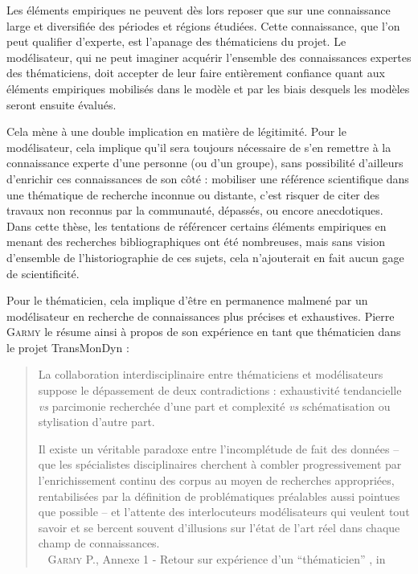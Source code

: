 Les éléments empiriques ne peuvent dès lors reposer que sur une connaissance large et diversifiée des périodes et régions étudiées.
Cette connaissance, que l'on peut qualifier d'experte, est l'apanage des \og thématiciens\fg{} du projet.
Le modélisateur, qui ne peut imaginer acquérir l'ensemble des connaissances expertes des thématiciens, doit accepter de leur faire entièrement confiance quant aux éléments empiriques mobilisés dans le modèle et par les biais desquels les modèles seront ensuite évalués.

Cela mène à une double implication en matière de légitimité.
Pour le modélisateur, cela implique qu'il sera toujours nécessaire de s'en remettre à la connaissance experte d'une personne (ou d'un groupe), sans possibilité d'ailleurs d'enrichir ces connaissances de son côté :
	mobiliser une référence scientifique dans une thématique de recherche inconnue ou distante, c'est risquer de citer des travaux non reconnus par la communauté, dépassés, ou encore anecdotiques.
Dans cette thèse, les tentations de référencer certains éléments empiriques en menant des recherches bibliographiques ont été nombreuses, mais sans vision d'ensemble de l'historiographie de ces sujets, cela n'ajouterait en fait aucun gage de scientificité.

Pour le thématicien, cela implique d'être en permanence \og malmené\fg{} par un modélisateur en recherche de connaissances plus précises et exhaustives.
Pierre \textsc{Garmy} le résume ainsi à propos de son expérience en tant que thématicien dans le projet TransMonDyn :
\begin{quotation}
\noindent \og La collaboration interdisciplinaire entre thématiciens et modélisateurs suppose le dépassement de deux contradictions : exhaustivité tendancielle \textit{vs} parcimonie recherchée d'une part et complexité \textit{vs} schématisation ou stylisation d'autre part.

\noindent Il existe un véritable paradoxe entre l'incomplétude de fait des données -- que les spécialistes disciplinaires cherchent à combler progressivement par l'enrichissement continu des corpus au moyen de recherches appropriées, rentabilisées par la définition de problématiques préalables aussi pointues que possible -- et l'attente des interlocuteurs modélisateurs qui veulent tout savoir et se bercent souvent d'illusions sur l'état de l'art réel dans chaque champ de connaissances. \fg{} \\
\mbox{}~ \textsc{Garmy} P., \og Annexe 1 - Retour sur expérience d'un “thématicien” \fg{}, in \textcite[476]{ouriachi_lelaboration_2017}  	  
\end{quotation}

